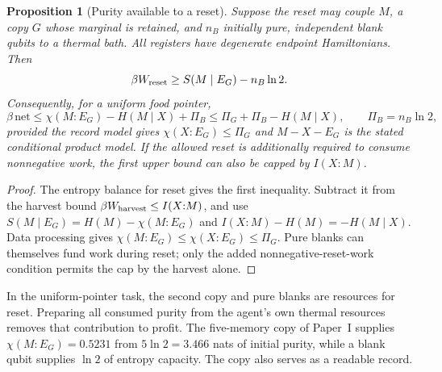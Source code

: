 \documentclass[12pt]{article}
\newtheorem{proposition}[theorem]{Proposition}
\theoremstyle{definition}
\begin{document}
\begin{proposition}[Purity available to a reset]
\label{prop:purity_copy}
Suppose the reset may couple $M$, a copy $G$ whose marginal is retained,
and $n_B$ initially pure, independent blank qubits to a thermal bath.
All registers have degenerate endpoint Hamiltonians. Then
\[
 \beta W_{\rm reset}\ge S(M\mid E_G)-n_B\ln2.
\]
Consequently, for a uniform food pointer,
\[
 \beta\,\mathrm{net}
 \le \chi(M{:}E_G)-H(M\mid X)+\Pi_B
 \le \Pi_G+\Pi_B-H(M\mid X),\qquad \Pi_B=n_B\ln2,
\]
provided the record model gives $\chi(X{:}E_G)\le\Pi_G$ and
$M-X-E_G$ is the stated conditional product model.
If the allowed reset is additionally required to consume nonnegative work,
the first upper bound can also be capped by $I(X{:}M)$.
\end{proposition}
\begin{proof}
The entropy balance for reset gives the first inequality. Subtract it from
the harvest bound $\beta W_{\rm harvest}\le I(X{:}M)$, and use
$S(M\mid E_G)=H(M)-\chi(M{:}E_G)$ and
$I(X{:}M)-H(M)=-H(M\mid X)$.
Data processing gives $\chi(M{:}E_G)\le\chi(X{:}E_G)\le\Pi_G$.
Pure blanks can themselves fund work during reset; only the added
nonnegative-reset-work condition permits the cap by the harvest alone.
\end{proof}

In the uniform-pointer task, the second copy and pure blanks are resources for reset. Preparing all consumed purity from the agent's own thermal resources removes that contribution to profit. The five-memory copy of Paper~I supplies $\chi(M{:}E_G)=0.5231$ from $5\ln2=3.466$ nats of initial purity, while a blank qubit supplies $\ln2$ of entropy capacity. The copy also serves as a readable record.
\end{document}

